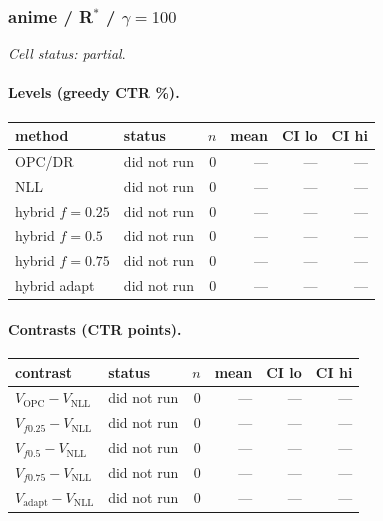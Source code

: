 \documentclass[10pt,a4paper]{article}
\begin{document}
\subsubsection{anime / R$^*$ / $\gamma=100$}
\emph{Cell status: partial}.
\paragraph{Levels (greedy CTR \%).}
{\centering\small\begin{tabular}{llrrrr}
\toprule method & status & $n$ & mean & CI lo & CI hi \\
\midrule
OPC/DR & did not run & 0 & --- & --- & --- \\
NLL & did not run & 0 & --- & --- & --- \\
hybrid $f{=}0.25$ & did not run & 0 & --- & --- & --- \\
hybrid $f{=}0.5$ & did not run & 0 & --- & --- & --- \\
hybrid $f{=}0.75$ & did not run & 0 & --- & --- & --- \\
hybrid adapt & did not run & 0 & --- & --- & --- \\
\bottomrule\end{tabular}\par}
\paragraph{Contrasts (CTR points).}
{\centering\small\begin{tabular}{llrrrr}
\toprule contrast & status & $n$ & mean & CI lo & CI hi \\
\midrule
$V_{\mathrm{OPC}}-V_{\mathrm{NLL}}$ & did not run & 0 & --- & --- & --- \\
$V_{f0.25}-V_{\mathrm{NLL}}$ & did not run & 0 & --- & --- & --- \\
$V_{f0.5}-V_{\mathrm{NLL}}$ & did not run & 0 & --- & --- & --- \\
$V_{f0.75}-V_{\mathrm{NLL}}$ & did not run & 0 & --- & --- & --- \\
$V_{\mathrm{adapt}}-V_{\mathrm{NLL}}$ & did not run & 0 & --- & --- & --- \\
\bottomrule\end{tabular}\par}
\end{document}
